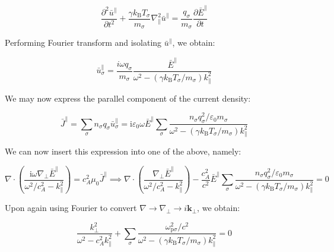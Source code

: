 \begin{equation}
    \frac{\partial^2\bar{u}^\parallel}{\partial t^2}+\frac{\gamma k_\mathrm{B}T_\sigma}{m_\sigma}\nabla_\parallel^2\bar{u}^\parallel=\frac{q_\sigma}{m_\sigma}\frac{\partial\bar{E}^\parallel}{\partial t}
\end{equation}

Performing Fourier transform and isolating $\bar{u}^\parallel$, we obtain:

\begin{equation}
    \bar{u}_\sigma^\parallel=\frac{i\omega q_\sigma}{m_\sigma}\frac{\bar{E}^\parallel}{\omega^2-(\gamma k_\mathrm{B}T_\sigma/m_\sigma)k_\parallel^2}
\end{equation}

We may now express the parallel component of the current density:

\begin{equation}
    \bar{J}^\parallel=\sum_{\sigma}n_\sigma q_\sigma\bar{u}_\sigma^\parallel=\mathrm{i}\varepsilon_0\omega\bar{E}^\parallel\sum_\sigma\frac{n_\sigma q_\sigma^2/\varepsilon_0m_\sigma}{\omega^2-(\gamma k_\mathrm{B}T_\sigma/m_\sigma)k_\parallel^2}
\end{equation}

We can now insert this expression into one of the above, namely:

\begin{equation}
    \nabla\cdot\left(\frac{\mathrm{i}\omega\nabla_\perp\bar{E}^\parallel}{\omega^2/c_A^2-k_\parallel^2}\right)=c_A^2\mu_0\bar{J}^\parallel\implies\nabla\cdot\left(\frac{\nabla_\perp\bar{E}^\parallel}{\omega^2/c_A^2-k_\parallel^2}\right)-\frac{c_A^2}{c^2}\bar{E}^\parallel\sum_\sigma\frac{n_\sigma q_\sigma^2/\varepsilon_0m_\sigma}{\omega^2-(\gamma k_\mathrm{B}T_\sigma/m_\sigma)k_\parallel^2}=0
\end{equation}

Upon again using Fourier to convert $\nabla\to\nabla_\perp\to i\mathbf{k}_\perp$, we obtain:

\begin{equation}
    \frac{k_\perp^2}{\omega^2-c_A^2k_\parallel^2}+\sum_{\sigma}\frac{\omega_{\mathrm{p}\sigma}^2/c^2}{\omega^2-(\gamma k_\mathrm{B}T_\sigma/m_\sigma)k_\parallel^2}=0
\end{equation}

